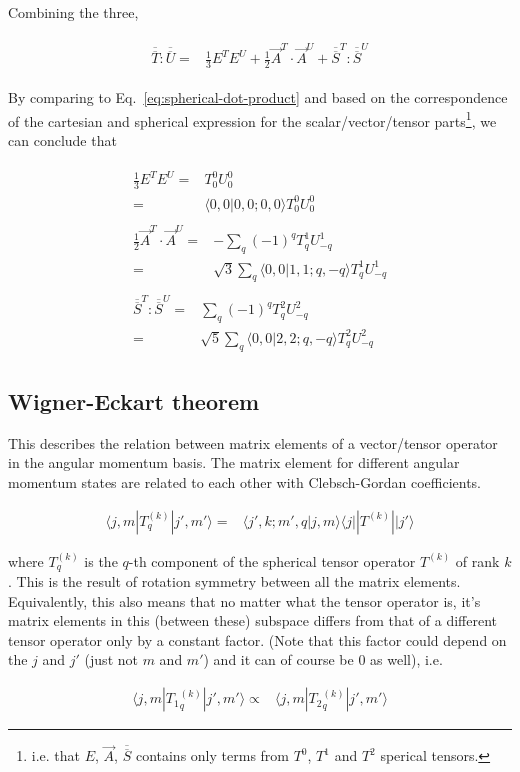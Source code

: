\documentclass[10pt,fleqn]{article}
\newcommand{\eqar}[1]
{
  \begin{align}
    #1
  \end{align}
}
\begin{document}
Combining the three,
\eqar{
  \begin{split}
    \overline{\overline{T}}:\overline{\overline{U}}=&\frac13E^{T}E^{U}+\frac12\vec A^{T}\cdot\vec A^{U}+\overline{\overline{S}}^{T}:\overline{\overline{S}}^{U}
  \end{split}
}
By comparing to Eq.~\ref{eq:spherical-dot-product} and based on the correspondence
of the cartesian and spherical expression for the scalar/vector/tensor parts\footnote{i.e. that $E$, $\vec A$, $\overline{\overline{S}}$ contains only terms from
$T^0$, $T^1$ and $T^2$ sperical tensors.}, we can conclude that
\eqar{
  \begin{split}
    \frac13E^{T}E^{U}=&T^0_0U^0_0\\
    =&\langle 0,0|0,0;0,0\rangle T^0_0U^0_{0}
  \end{split}\\
  \begin{split}
    \frac12\vec A^{T}\cdot\vec A^{U}=&-\sum_{q}(-1)^{q}T^1_qU^1_{-q}\\
    =&\sqrt{3}\sum_{q}\langle 0,0|1,1;q,-q\rangle T^1_qU^1_{-q}
  \end{split}\\
  \begin{split}
    \overline{\overline{S}}^{T}:\overline{\overline{S}}^{U}=&\sum_{q}(-1)^{q}T^2_qU^2_{-q}\\
    =&\sqrt{5}\sum_{q}\langle 0,0|2,2;q,-q\rangle T^2_qU^2_{-q}
  \end{split}
}

\subsection{Wigner-Eckart theorem}
This describes the relation between matrix elements of a vector/tensor operator
in the angular momentum basis.
The matrix element for different angular momentum states are related to each other
with Clebsch-Gordan coefficients.
\eqar{
  \langle j,m|T_q^{(k)}|j',m' \rangle=&\langle j',k;m',q|j,m\rangle\langle j||T^{(k)}||j'\rangle\label{eq:wigner-eckart}
}
where $T_q^{(k)}$ is the $q$-th component of
the spherical tensor operator $T^{(k)}$ of rank $k$.
This is the result of rotation symmetry between all the matrix elements.\\

Equivalently, this also means that no matter what the tensor operator is,
it's matrix elements in this (between these) subspace
differs from that of a different tensor operator only by a constant factor.
(Note that this factor could depend on the $j$ and $j'$ (just not $m$ and $m'$)
and it can of course be $0$ as well), i.e.
\eqar{
  \langle j,m|{T_1}_q^{(k)}|j',m'\rangle\propto&\langle j,m|{T_2}_q^{(k)}|j',m'\rangle
}
\end{document}
